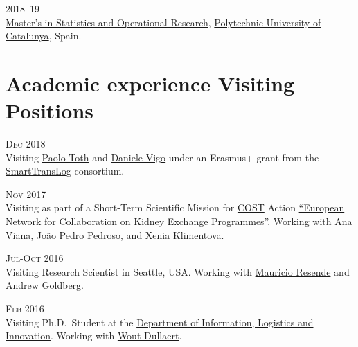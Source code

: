 \begin{paracol}{2}
  \textsc{2018--19}
\switchcolumn
  \\
  \href{https://mesioupcub.masters.upc.edu/en}{Master's in Statistics and Operational Research}, \href{https://www.upc.edu/en}{Polytechnic University of Catalunya}, Spain.
\end{paracol}

\section*{Academic experience {\small Visiting Positions}}

\begin{paracol}{2}
  \textsc{Dec 2018}
\switchcolumn
  \\
  Visiting \href{https://scholar.google.it/citations?user=2IPL4XIAAAAJ}{Paolo Toth} and \href{https://scholar.google.com/citations?user=2kk8d_AAAAAJ}{Daniele Vigo} under an Erasmus+ grant from the \href{https://smarttranslog.wordpress.com/}{SmartTransLog} consortium.
\end{paracol}

\begin{paracol}{2}
  \textsc{Nov 2017}
\switchcolumn
  \\
  Visiting as part of a Short-Term Scientific Mission for \href{http://www.cost.eu/}{COST} Action \href{http://www.enckep-cost.eu/}{``European Network for Collaboration on Kidney Exchange Programmes''}.
  Working with \href{https://scholar.google.com/citations?user=RW7QevYAAAAJ}{Ana Viana}, \href{https://scholar.google.it/citations?user=aWTZf_AAAAAJ}{João Pedro Pedroso}, and \href{http://orcid.org/0000-0003-1085-0810}{Xenia Klimentova}.
\end{paracol}

\begin{paracol}{2}
  \textsc{Jul-Oct 2016}
\switchcolumn
  \\
  Visiting Research Scientist in Seattle, USA. Working with \href{https://scholar.google.com/citations?user=KTmPx50AAAAJ}{Mauricio Resende} and \href{https://scholar.google.it/citations?user=U5iFVowAAAAJ}{Andrew Goldberg}.
\end{paracol}

\begin{paracol}{2}
  \textsc{Feb 2016}
\switchcolumn
  \\
  Visiting Ph.D.\ Student at the \href{https://sbe.vu.nl/en/departments-and-institutes/information-logistics-and-innovation/index.aspx}{Department of Information, Logistics and Innovation}. Working with \href{https://scholar.google.com/citations?user=wjjCd5UAAAAJ}{Wout Dullaert}.
\end{paracol}

